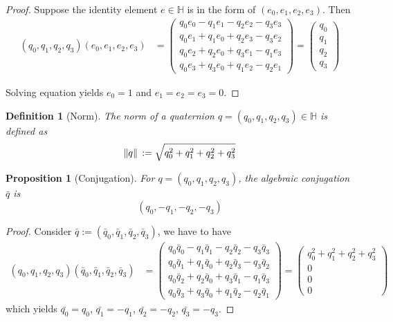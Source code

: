 \documentclass[12pt]{article}
\newtheorem*{definition}{Definition}
\newtheorem*{proposition}{Proposition}
\begin{document}
    \begin{proof}
        Suppose the identity element $e\in\mathbb{H}$ is in the form of $(e_0,e_1,e_2,e_3)$. Then \begin{align*}
            (q_0,q_1,q_2,q_3)(e_0,e_1,e_2,e_3)&=\begin{pmatrix}
                q_0e_0-q_1e_1-q_2e_2-q_3e_3\\
                q_0e_1+q_1e_0+q_2e_3-q_3e_2\\
                q_0e_2+q_2e_0+q_3e_1-q_1e_3\\
                q_0e_3+q_3e_0+q_1e_2-q_2e_1
            \end{pmatrix}
            =\begin{pmatrix}
                q_0\\q_1\\q_2\\q_3
            \end{pmatrix}
        \end{align*}

        Solving equation yields $e_0=1$ and $e_1=e_2=e_3=0$.
    \end{proof}

    \begin{definition}[Norm]
        The norm of a quaternion $q=(q_0,q_1,q_2,q_3)\in\mathbb{H}$ is defined as $$\norm*{q}:=\sqrt{q_0^2+q_1^2+q_2^2+q_3^2}$$
    \end{definition}

    \begin{proposition}[Conjugation]
        For $q=(q_0,q_1,q_2,q_3)$, the algebraic conjugation $\bar{q}$ is $$(q_0,-q_1,-q_2,-q_3)$$
    \end{proposition}

    \begin{proof}
        Consider $\bar{q}:=(\bar{q}_0,\bar{q}_1,\bar{q}_2,\bar{q}_3)$, we have to have \begin{align*}
            (q_0,q_1,q_2,q_3)(\bar{q}_0,\bar{q}_1,\bar{q}_2,\bar{q}_3)&=\begin{pmatrix}
                q_0\bar{q}_0-q_1\bar{q}_1-q_2\bar{q}_2-q_3\bar{q}_3\\
                q_0\bar{q}_1+q_1\bar{q}_0+q_2\bar{q}_3-q_3\bar{q}_2\\
                q_0\bar{q}_2+q_2\bar{q}_0+q_3\bar{q}_1-q_1\bar{q}_3\\
                q_0\bar{q}_3+q_3\bar{q}_0+q_1\bar{q}_2-q_2\bar{q}_1
            \end{pmatrix}
            =\begin{pmatrix}
                q_0^2+q_1^2+q_2^2+q_3^2\\0\\0\\0
            \end{pmatrix}
        \end{align*}
        which yields $\bar{q_0}=q_0$, $\bar{q_1}=-q_1$, $\bar{q_2}=-q_2$, $\bar{q_3}=-q_3$.
    \end{proof}
\end{document}
